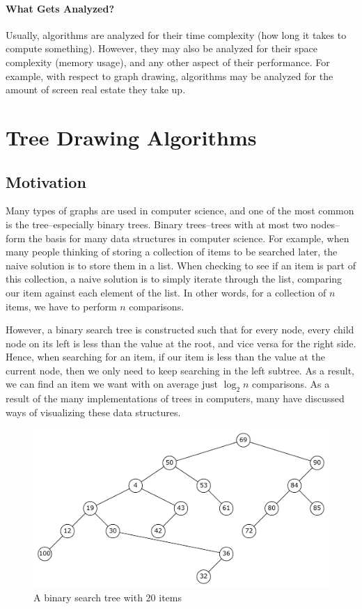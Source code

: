 \documentclass[11pt]{report}
\begin{document}
\subsubsection{What Gets Analyzed?}
Usually, algorithms are analyzed for their time complexity (how long it takes to compute something). However, they may also be analyzed for their space complexity (memory usage), and any other aspect of their performance. For example, with respect to graph drawing, algorithms may be analyzed for the amount of screen real estate they take up.

\chapter{Tree Drawing Algorithms}
\section{Motivation}
Many types of graphs are used in computer science, and one of the most common is the tree--especially binary trees. Binary trees--trees with at most two nodes--form the basis for many data structures in computer science. For example, when many people thinking of storing a collection of items to be searched later, the naive solution is to store them in a list. When checking to see if an item is part of this collection, a naive solution is to simply iterate through the list, comparing our item against each element of the list. In other words, for a collection of $n$ items, we have to perform $n$ comparisons.

\bigskip

However, a binary search tree is constructed such that for every node, every child node on its left is less than the value at the root, and vice versa for the right side. Hence, when searching for an item, if our item is less than the value at the current node, then we only need to keep searching in the left subtree. As a result, we can find an item we want with on average just $\log_2{n}$ comparisons. As a result of the many implementations of trees in computers, many have discussed ways of visualizing these data structures.

\begin{figure}[H]
    \includegraphics[width=\linewidth]{report/bst_20.pdf}
    \caption{A binary search tree with 20 items}
\end{figure}
\end{document}
